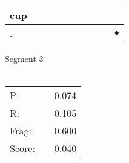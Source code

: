 \documentclass[landscape]{article}
\newcommand{\ssp}{\hspace{2pt}}
\newcommand{\mex}{\cellcolor{g}$\bullet$}
\begin{document}
\begin{tabular}{|l|p{10pt}|p{10pt}|p{10pt}|p{10pt}|p{10pt}|p{10pt}|p{10pt}|p{10pt}|p{10pt}|}
\hline
\ssp cup \ssp&\hspace{2pt}&\hspace{2pt}&\hspace{2pt}&\hspace{2pt}&\hspace{2pt}&\hspace{2pt}&\hspace{2pt}&\hspace{2pt}&\hspace{2pt}\\
\hline
\ssp \cellcolor{ref8}. \ssp&\hspace{2pt}&\hspace{2pt}&\hspace{2pt}&\hspace{2pt}&\hspace{2pt}&\hspace{2pt}&\hspace{2pt}&\hspace{2pt}&\hspace{2pt}\mex\\
\hline
\end{tabular}

\vspace{6pt}
\noindent Segment 3\\\\
\noindent\begin{tabular}{lm{12pt}r}
\hline
P:&&0.074\\
R:&&0.105\\
Frag:&&0.600\\
Score:&&0.040\\
\end{tabular}

\newpage
\end{document}
